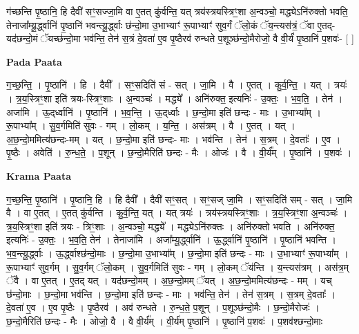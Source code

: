 \documentclass[17pt]{extarticle}
\begin{document}
ग॑च्छन्ति पृ॒ष्ठानि॒ हि दैवी॑ सꣳ॒॒सज्जा॒मि वा ए॒तत् कु॑र्वन्ति॒ यत् त्रय॑स्त्रयस्त्रिꣳ॒॒शा अ॒न्वञ्चो॒ मद्ध्येऽनि॑रुक्तो भवति॒ तेनाजा᳚म्यू॒र्द्ध्वानि॑ पृ॒ष्ठानि॑ भवन्त्यू॒र्द्ध्वाः छ॑न्दो॒मा उ॒भाभ्याꣳ॑ रू॒पाभ्याꣳ॑ सुव॒र्गं ॅलो॒कं ॅय॒न्त्यस॑त्रं॒ ॅवा ए॒तद्-यद॑छन्दो॒मं ॅयच्छ॑न्दो॒मा भव॑न्ति॒ तेन॑ स॒त्रं दे॒वता॑ ए॒व पृ॒ष्ठैरव॑ रुन्धते प॒शूञ्छ॑न्दो॒मैरोजो॒ वै वी॒र्यं॑ पृ॒ष्ठानि॑ प॒शवः॑- [  ] \newline

\textbf{Pada Paata} \newline

ग॒च्छ॒न्ति॒ । पृ॒ष्ठानि॑ । हि । दैवी᳚ । सꣳ॒॒सदिति॑ सं - सत् । जा॒मि । वै । ए॒तत् । कु॒र्व॒न्ति॒ । यत् । त्रयः॑ । त्र॒य॒स्त्रिꣳ॒॒शा इति॑ त्रयः-स्त्रिꣳ॒॒शाः । अ॒न्वञ्चः॑ । मद्ध्ये᳚ । अनि॑रुक्त॒ इत्यनिः॑ - उ॒क्तः॒ । भ॒व॒ति॒ । तेन॑ । अजा॑मि । ऊ॒द्‌र्ध्वानि॑ । पृ॒ष्ठानि॑ । भ॒व॒न्ति॒ । ऊ॒द्‌र्ध्वाः । छ॒न्दो॒मा इति॑ छन्दः - माः । उ॒भाभ्या᳚म् । रू॒पाभ्या᳚म् । सु॒व॒र्गमिति॑ सुवः - गम् । लो॒कम् । य॒न्ति॒ । अस॑त्रम् । वै । ए॒तत् । यत् । अ॒छ॒न्दो॒ममित्य॑छन्दः-मम् । यत् । छ॒न्दो॒मा इति॑ छन्दः- माः । भव॑न्ति । तेन॑ । स॒त्रम् । दे॒वताः᳚ । ए॒व । पृ॒ष्ठैः । अवेति॑ । रु॒न्ध॒ते॒ । प॒शून् । छ॒न्दो॒मैरिति॑ छन्दः - मैः । ओजः॑ । वै । वी॒र्य᳚म् । पृ॒ष्ठानि॑ । प॒शवः॑ ।  \newline


\textbf{Krama Paata} \newline

ग॒च्छ॒न्ति॒ पृ॒ष्ठानि॑ । पृ॒ष्ठानि॒ हि । हि दैवी᳚ । दैवी॑ सꣳ॒॒सत् । सꣳ॒॒सज् जा॒मि । सꣳ॒॒सदिति॑ सम् - सत् । जा॒मि वै । वा ए॒तत् । ए॒तत् कु॑र्वन्ति । कु॒र्व॒न्ति॒ यत् । यत् त्रयः॑ । त्रय॑स्त्रयस्त्रिꣳ॒॒शाः । त्र॒य॒स्त्रिꣳ॒॒शा अ॒न्वञ्चः॑ । त्र॒य॒स्त्रिꣳ॒॒शा इति॑ त्रयः - त्रिꣳ॒॒शाः । अ॒न्वञ्चो॒ मद्ध्ये᳚ । मद्ध्येऽनि॑रुक्तः । अनि॑रुक्तो भवति । अनि॑रुक्त॒ इत्यनिः॑ - उ॒क्तः॒ । भ॒व॒ति॒ तेन॑ । तेनाजा॑मि । अजा᳚म्यू॒र्द्ध्वानि॑ । ऊ॒र्द्ध्वानि॑ पृ॒ष्ठानि॑ । पृ॒ष्ठानि॑ भवन्ति । भ॒व॒न्त्यू॒र्द्ध्वाः । ऊ॒र्द्ध्वाश्छ॑न्दो॒माः । छ॒न्दो॒मा उ॒भाभ्या᳚म् । छ॒न्दो॒मा इति॑ छन्दः - माः । उ॒भाभ्याꣳ॑ रू॒पाभ्या᳚म् । रू॒पाभ्याꣳ॑ सुव॒र्गम् । सु॒व॒र्गम् ॅलो॒कम् । सु॒व॒र्गमिति॑ सुवः - गम् । लो॒कम् ॅय॑न्ति । य॒न्त्यस॑त्रम् । अस॑त्र॒म् ॅवै । वा ए॒तत् । ए॒तद् यत् । यद॑छन्दो॒मम् । अ॒छ॒न्दो॒मम् ॅयत् । अ॒छ॒न्दो॒ममित्य॑छन्दः - मम् । यच् छ॑न्दो॒माः । छ॒न्दो॒मा भव॑न्ति । छ॒न्दो॒मा इति॑ छन्दः - माः । भव॑न्ति॒ तेन॑ । तेन॑ स॒त्रम् । स॒त्रम् दे॒वताः᳚ । दे॒वता॑ ए॒व । ए॒व पृ॒ष्ठैः । पृ॒ष्ठैरव॑ । अव॑ रुन्धते । रु॒न्ध॒ते॒ प॒शून् । प॒शूञ्छ॑न्दो॒मैः । छ॒न्दो॒मैरोजः॑ । छ॒न्दो॒मैरिति॑ छन्दः - मैः । ओजो॒ वै । वै वी॒र्य᳚म् । वी॒र्य॑म् पृ॒ष्ठानि॑ । पृ॒ष्ठानि॑ प॒शवः॑ । प॒शव॑श्छन्दो॒माः \newline
\end{document}
